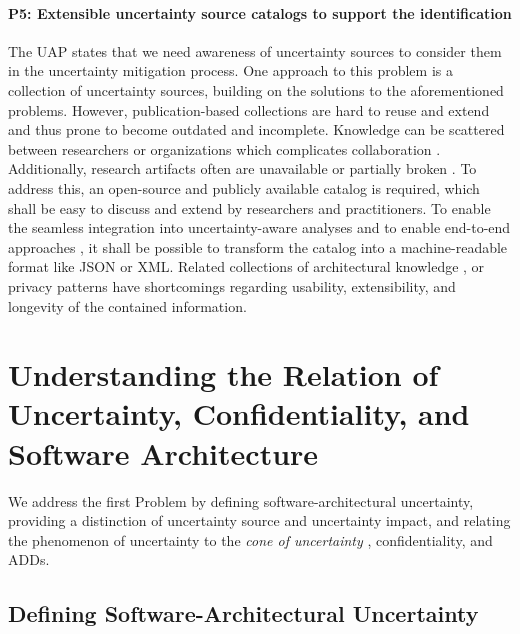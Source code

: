 \paragraph{P5: Extensible uncertainty source catalogs to support the identification}\label{p:1:5}
The \acf{UAP} states that we need awareness of uncertainty sources to consider them in the uncertainty mitigation process.
One approach to this problem is a collection of uncertainty sources, building on the solutions to the aforementioned problems.
However, publication-based collections are hard to reuse and extend \cite{ramirez_taxonomy_2012} and thus prone to become outdated and incomplete.
Knowledge can be scattered between researchers or organizations which complicates collaboration \cite{sterz_intelligente_2022}.
Additionally, research artifacts often are unavailable \cite{konersmann_evaluation_2022} or partially broken \cite{gerdes_decision_2015,colesky_system_2018}.
To address this, an open-source and publicly available catalog is required, which shall be easy to discuss and extend by researchers and practitioners. 
To enable the seamless integration into uncertainty-aware analyses and to enable end-to-end approaches \cite{weyns_towards_2023}, it shall be possible to transform the catalog into a machine-readable format like \acf{JSON} or \ac{XML}.
Related collections of architectural knowledge \cite{gerdes_decision_2015}, or privacy patterns \cite{colesky_system_2018} have shortcomings regarding usability, extensibility, and longevity of the contained information.





\section[The Relation of Uncertainty, Confidentiality, and Software Architecture]{Understanding the Relation of Uncertainty, Confidentiality, and Software Architecture}%
\label{sec:classification:relation}

We address the first Problem  by defining software-architectural uncertainty, providing a distinction of uncertainty source and uncertainty impact, and relating the phenomenon of uncertainty to the \emph{cone of uncertainty} \cite{mcconnell_software_1998}, confidentiality, and \acp{ADD}.


\subsection{Defining Software-Architectural Uncertainty}

